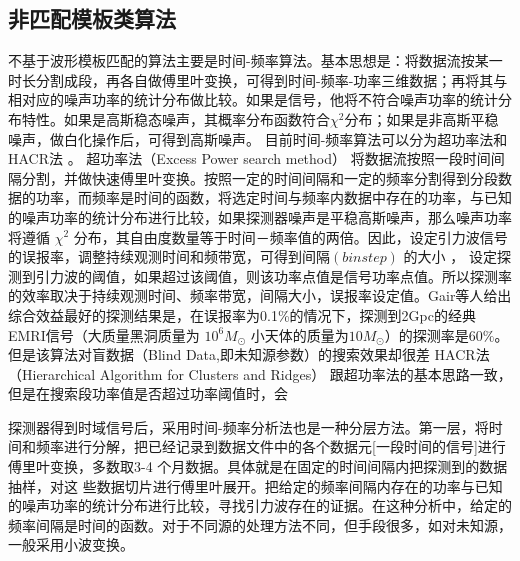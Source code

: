 \begin{comment}
在模板库中任意取一个模板去计算似然函数比，则可化为矩阵形式。
\begin{equation}
log \Lambda = a^T N -\frac{1}{2}a^T M a
\end{equation}
其中$s$表示的是科学数据，且$s(t)=n(t)+h(t)$。向量$N$和矩阵$M$表示为
$$N^{(k)}:=(s|h^{(k)}),M^{(k)(l)}:=(h^{(k)}|h^{(l)})$$
对于采用最大似然估计方法（Maximum likehood estimation),外禀参数可以用最大似然估计得到$\hat{a}=M^{-1}N$
\end{comment}




\subsection{非匹配模板类算法}
不基于波形模板匹配的算法主要是时间-频率算法。基本思想是：将数据流按某一时长分割成段，再各自做傅里叶变换，可得到时间-频率-功率三维数据；再将其与相对应的噪声功率的统计分布做比较。如果是信号，他将不符合噪声功率的统计分布特性。如果是高斯稳态噪声，其概率分布函数符合$χ^2$分布；如果是非高斯平稳噪声，做白化操作后，可得到高斯噪声。
目前时间-频率算法可以分为超功率法和HACR法 。
	超功率法（Excess Power search method）\cite{gair2005detecting}
将数据流按照一段时间间隔分割，并做快速傅里叶变换。按照一定的时间间隔和一定的频率分割得到分段数据的功率，而频率是时间的函数，将选定时间与频率内数据中存在的功率，与已知的噪声功率的统计分布进行比较，如果探测器噪声是平稳高斯噪声，那么噪声功率将遵循 ${\chi}^2 $ 分布，其自由度数量等于时间－频率值的两倍。因此，设定引力波信号的误报率，调整持续观测时间和频带宽，可得到间隔$(bin step )$ 的大小
，
设定探测到引力波的阈值，如果超过该阈值，则该功率点值是信号功率点值。所以探测率的效率取决于持续观测时间、频率带宽，间隔大小，误报率设定值。Gair等人\cite{gair2005detecting}给出综合效益最好的探测结果是，在误报率为0.1\%的情况下，探测到2Gpc的经典EMRI信号（大质量黑洞质量为 $10^6 M_{\odot}$ 小天体的质量为$10M_{\odot}$）的探测率是$60\%$。但是该算法对盲数据（Blind Data,即未知源参数）的搜索效果却很差
	HACR法（Hierarchical Algorithm for Clusters and Ridges）\cite{gair2008constrained}
跟超功率法的基本思路一致，但是在搜索段功率值是否超过功率阈值时，会

探测器得到时域信号后，采用时间-频率分析法也是一种分层方法。第一层，将时间和频率进行分解，把已经记录到数据文件中的各个数据元[一段时间的信号]进行傅里叶变换，多数取3-4 个月数据。具体就是在固定的时间间隔内把探测到的数据抽样，对这
些数据切片进行傅里叶展开。把给定的频率间隔内存在的功率与已知的噪声功率的统计分布进行比较，寻找引力波存在的证据。在这种分析中，给定的频率间隔是时间的函数。对于不同源的处理方法不同，但手段很多，如对未知源，一般采用小波变换。

